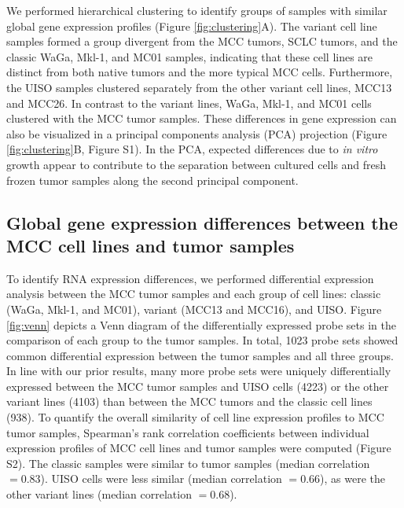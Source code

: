 \documentclass[10pt]{article}
\begin{document}
We performed hierarchical clustering to identify groups of samples with similar global gene expression profiles (Figure \ref{fig:clustering}A).
The variant cell line samples formed a group divergent from the MCC tumors, SCLC tumors, and the classic WaGa, Mkl-1, and MC01 samples, indicating that these cell lines are distinct from both native tumors and the more typical MCC cells.
Furthermore, the UISO samples clustered separately from the other variant cell lines, MCC13 and MCC26.
In contrast to the variant lines, WaGa, Mkl-1, and MC01 cells clustered with the MCC tumor samples.
These differences in gene expression can also be visualized in a principal components analysis (PCA) projection (Figure \ref{fig:clustering}B, Figure S1).
In the PCA, expected differences due to \emph{in vitro} growth appear to contribute to the separation between cultured cells and fresh frozen tumor samples along the second principal component.

\subsection*{Global gene expression differences between the MCC cell lines and tumor samples}
To identify RNA expression differences, we performed differential expression analysis between the MCC tumor samples and each group of cell lines: classic (WaGa, Mkl-1, and MC01), variant (MCC13 and MCC16), and UISO.
Figure \ref{fig:venn} depicts a Venn diagram of the differentially expressed probe sets in the comparison of each group to the tumor samples.
In total, 1023 probe sets showed common differential expression between the tumor samples and all three groups.
In line with our prior results, many more probe sets were uniquely differentially expressed between the MCC tumor samples and UISO cells (4223) or the other variant lines (4103) than between the MCC tumors and the classic cell lines (938).
To quantify the overall similarity of cell line expression profiles to MCC tumor samples, Spearman's rank correlation coefficients between individual expression profiles of MCC cell lines and tumor samples were computed (Figure S2).
The classic samples were similar to tumor samples (median correlation $=0.83$).
UISO cells were less similar (median correlation $=0.66$), as were the other variant lines (median correlation $=0.68$).
\end{document}
